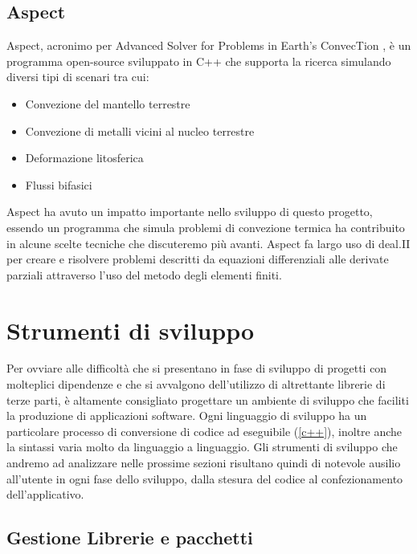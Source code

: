     \subsection{Aspect}
    Aspect, acronimo per Advanced Solver for Problems in Earth's ConvecTion \cite{aspectmanual}, è un programma open-source
    sviluppato in C++ che supporta la ricerca simulando diversi tipi di scenari tra cui:
    \begin{itemize}
        \item Convezione del mantello terrestre
        \item Convezione di metalli vicini al nucleo terrestre
        \item Deformazione litosferica
        \item Flussi bifasici
    \end{itemize}
    Aspect ha avuto un impatto importante nello sviluppo di questo progetto, essendo un programma che simula
    problemi di convezione termica ha contribuito in alcune scelte tecniche che discuteremo più avanti.
    Aspect fa largo uso di deal.II per creare e risolvere problemi descritti da equazioni differenziali
    alle derivate parziali attraverso l'uso del metodo degli elementi finiti.

\section{Strumenti di sviluppo}
Per ovviare alle difficoltà che si presentano in fase di sviluppo di progetti con molteplici dipendenze e che si avvalgono
dell'utilizzo di altrettante librerie di terze parti, è altamente consigliato progettare un ambiente di sviluppo che faciliti
la produzione di applicazioni software. Ogni linguaggio di sviluppo ha un particolare processo di conversione di codice
ad eseguibile (\ref{c++}), inoltre anche la sintassi varia molto da linguaggio a linguaggio. Gli strumenti di sviluppo che andremo
ad analizzare nelle prossime sezioni risultano quindi di notevole ausilio all'utente in ogni fase dello sviluppo, dalla stesura del codice
al confezionamento dell'applicativo.
    \subsection{Gestione Librerie e pacchetti}
